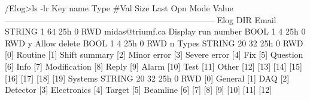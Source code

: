 \begin{DoxyCode}
/Elog>ls -lr
Key name                        Type    #Val  Size  Last Opn Mode Value
---------------------------------------------------------------------------
Elog                            DIR
   Email                       STRING  1     64    25h  0   RWD  midas@triumf.ca
    Display run number          BOOL    1     4     25h  0   RWD  y
    Allow delete                BOOL    1     4     25h  0   RWD  n
    Types                       STRING  20    32    25h  0   RWD  
                                        [0]             Routine
                                        [1]             Shift summary
                                        [2]             Minor error
                                        [3]             Severe error
                                        [4]             Fix
                                        [5]             Question
                                        [6]             Info
                                        [7]             Modification
                                        [8]             Reply
                                        [9]             Alarm
                                        [10]            Test
                                        [11]            Other
                                        [12]            
                                        [13]            
                                        [14]            
                                        [15]            
                                        [16]            
                                        [17]            
                                        [18]            
                                        [19]            
    Systems                     STRING  20    32    25h  0   RWD  
                                        [0]             General
                                        [1]             DAQ
                                        [2]             Detector
                                        [3]             Electronics
                                        [4]             Target
                                        [5]             Beamline
                                        [6]             
                                        [7]             
                                        [8]             
                                        [9]             
                                        [10]            
                                        [11]            
                                        [12]            

\end{DoxyCode}
